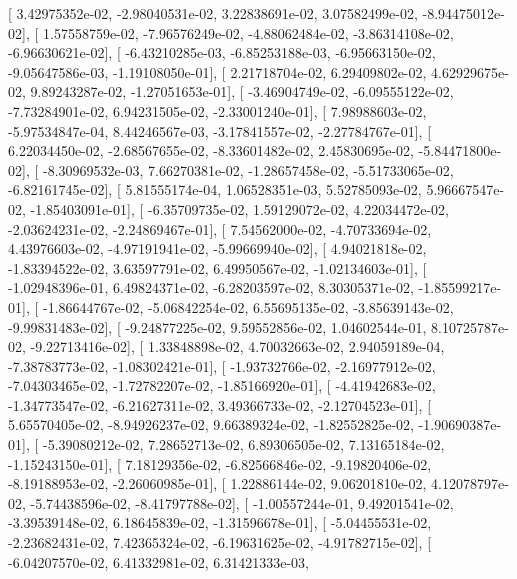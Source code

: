 \documentclass{article}
\begin{document}
       [  3.42975352e-02,  -2.98040531e-02,   3.22838691e-02,
          3.07582499e-02,  -8.94475012e-02],
       [  1.57558759e-02,  -7.96576249e-02,  -4.88062484e-02,
         -3.86314108e-02,  -6.96630621e-02],
       [ -6.43210285e-03,  -6.85253188e-03,  -6.95663150e-02,
         -9.05647586e-03,  -1.19108050e-01],
       [  2.21718704e-02,   6.29409802e-02,   4.62929675e-02,
          9.89243287e-02,  -1.27051653e-01],
       [ -3.46904749e-02,  -6.09555122e-02,  -7.73284901e-02,
          6.94231505e-02,  -2.33001240e-01],
       [  7.98988603e-02,  -5.97534847e-04,   8.44246567e-03,
         -3.17841557e-02,  -2.27784767e-01],
       [  6.22034450e-02,  -2.68567655e-02,  -8.33601482e-02,
          2.45830695e-02,  -5.84471800e-02],
       [ -8.30969532e-03,   7.66270381e-02,  -1.28657458e-02,
         -5.51733065e-02,  -6.82161745e-02],
       [  5.81555174e-04,   1.06528351e-03,   5.52785093e-02,
          5.96667547e-02,  -1.85403091e-01],
       [ -6.35709735e-02,   1.59129072e-02,   4.22034472e-02,
         -2.03624231e-02,  -2.24869467e-01],
       [  7.54562000e-02,  -4.70733694e-02,   4.43976603e-02,
         -4.97191941e-02,  -5.99669940e-02],
       [  4.94021818e-02,  -1.83394522e-02,   3.63597791e-02,
          6.49950567e-02,  -1.02134603e-01],
       [ -1.02948396e-01,   6.49824371e-02,  -6.28203597e-02,
          8.30305371e-02,  -1.85599217e-01],
       [ -1.86644767e-02,  -5.06842254e-02,   6.55695135e-02,
         -3.85639143e-02,  -9.99831483e-02],
       [ -9.24877225e-02,   9.59552856e-02,   1.04602544e-01,
          8.10725787e-02,  -9.22713416e-02],
       [  1.33848898e-02,   4.70032663e-02,   2.94059189e-04,
         -7.38783773e-02,  -1.08302421e-01],
       [ -1.93732766e-02,  -2.16977912e-02,  -7.04303465e-02,
         -1.72782207e-02,  -1.85166920e-01],
       [ -4.41942683e-02,  -1.34773547e-02,  -6.21627311e-02,
          3.49366733e-02,  -2.12704523e-01],
       [  5.65570405e-02,  -8.94926237e-02,   9.66389324e-02,
         -1.82552825e-02,  -1.90690387e-01],
       [ -5.39080212e-02,   7.28652713e-02,   6.89306505e-02,
          7.13165184e-02,  -1.15243150e-01],
       [  7.18129356e-02,  -6.82566846e-02,  -9.19820406e-02,
         -8.19188953e-02,  -2.26060985e-01],
       [  1.22886144e-02,   9.06201810e-02,   4.12078797e-02,
         -5.74438596e-02,  -8.41797788e-02],
       [ -1.00557244e-01,   9.49201541e-02,  -3.39539148e-02,
          6.18645839e-02,  -1.31596678e-01],
       [ -5.04455531e-02,  -2.23682431e-02,   7.42365324e-02,
         -6.19631625e-02,  -4.91782715e-02],
       [ -6.04207570e-02,   6.41332981e-02,   6.31421333e-03,
\end{document}
